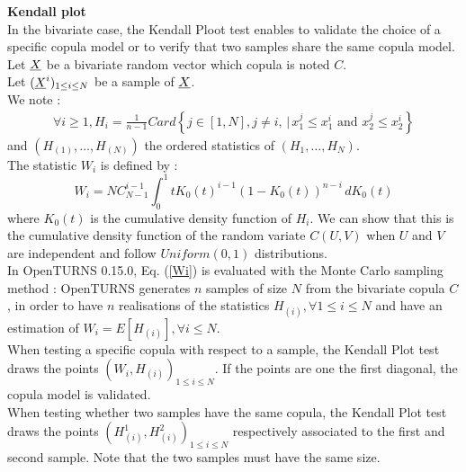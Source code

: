 {  \textbf{Kendall plot}\\

  In the bivariate case, the Kendall Ploot test enables to validate the choice of a specific copula model or to verify that two samples share the same copula model.\\
  Let ${\underline{X}}$ be a bivariate random vector which copula is noted $C$.\\

  Let $({\underline{X}}^i)_{1 \leq i \leq N}$ be a  sample of ${\underline{X}}$.\\

  We note :
  \begin{align*}
    \forall i \geq 1, \displaystyle H_i = \frac{1}{n-1} Card \left\{  j \in [1,N], j  \neq i, \, | \, x^j_1 \leq x^i_1 \mbox{ and } x^j_2 \leq x^i_2  \right \}
  \end{align*}
  and $(H_{(1)}, \dots, H_{(N)})$ the  ordered statistics of $(H_1, \dots, H_N)$.\\

  The statistic $W_i$ is defined by :
  \begin{equation} \label{Wi}
    W_i = N C_{N-1}^{i-1} \int_0^1 t K_0(t)^{i-1} (1-K_0(t))^{n-i} \, dK_0(t)
  \end {equation}
  where $K_0(t)$ is the cumulative density function of $H_i$. We can show that this is the cumulative density function of the random variate $C(U,V)$ when $U$ and $V$ are independent and follow $Uniform(0,1)$ distributions. \\


  In OpenTURNS 0.15.0, Eq. (\ref{Wi}) is evaluated with the Monte Carlo sampling method : OpenTURNS generates $n$ samples of size $N$ from the bivariate copula $C$, in order to have $n$ realisations of the statistics $H_{(i)},\forall 1 \leq i \leq N$ and have an estimation of $W_i = E[H_{(i)}], \forall i \leq N$. \\

  When testing a specific copula with respect to a sample, the Kendall Plot test draws the points $(W_i, H_{(i)})_{1 \leq i \leq N}$. If the points are one the first diagonal, the copula model is validated. \\

  When testing whether two samples have the same copula, the Kendall Plot test draws the points $(H^1_{(i)}, H^2_{(i)})_{1 \leq i \leq N}$ respectively associated to the first and second sample. Note that the two samples must have the same size.\\

}
